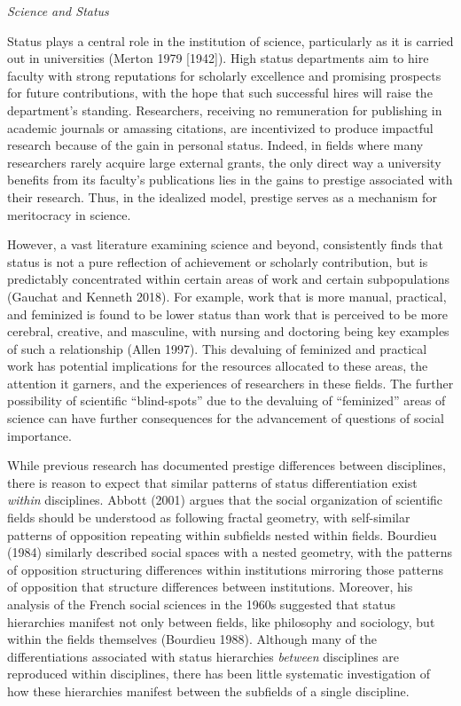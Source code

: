 \documentclass{article}
\begin{document}
\emph{Science and Status}

Status plays a central role in the institution of science, particularly
as it is carried out in universities (Merton 1979 {[}1942{]}). High
status departments aim to hire faculty with strong reputations for
scholarly excellence and promising prospects for future contributions,
with the hope that such successful hires will raise the department's
standing. Researchers, receiving no remuneration for publishing in
academic journals or amassing citations, are incentivized to produce
impactful research because of the gain in personal status. Indeed, in
fields where many researchers rarely acquire large external grants, the
only direct way a university benefits from its faculty's publications
lies in the gains to prestige associated with their research. Thus, in
the idealized model, prestige serves as a mechanism for meritocracy in
science.

However, a vast literature examining science and beyond, consistently
finds that status is not a pure reflection of achievement or scholarly
contribution, but is predictably concentrated within certain areas of
work and certain subpopulations (Gauchat and Kenneth 2018). For example,
work that is more manual, practical, and feminized is found to be lower
status than work that is perceived to be more cerebral, creative, and
masculine, with nursing and doctoring being key examples of such a
relationship (Allen 1997). This devaluing of feminized and practical
work has potential implications for the resources allocated to these
areas, the attention it garners, and the experiences of researchers in
these fields. The further possibility of scientific ``blind-spots'' due
to the devaluing of ``feminized'' areas of science can have further
consequences for the advancement of questions of social importance.

While previous research has documented prestige differences between
disciplines, there is reason to expect that similar patterns of status
differentiation exist \emph{within} disciplines. Abbott (2001) argues
that the social organization of scientific fields should be understood
as following fractal geometry, with self-similar patterns of opposition
repeating within subfields nested within fields. Bourdieu (1984)
similarly described social spaces with a nested geometry, with the
patterns of opposition structuring differences within institutions
mirroring those patterns of opposition that structure differences
between institutions. Moreover, his analysis of the French social
sciences in the 1960s suggested that status hierarchies manifest not
only between fields, like philosophy and sociology, but within the
fields themselves (Bourdieu 1988). Although many of the differentiations
associated with status hierarchies \emph{between} disciplines are
reproduced within disciplines, there has been little systematic
investigation of how these hierarchies manifest between the subfields of
a single discipline.
\end{document}
